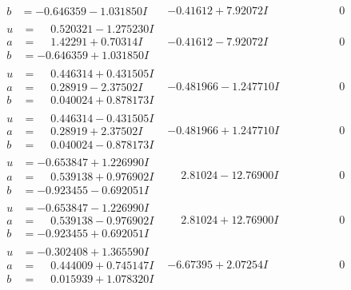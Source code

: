 \documentclass[1p]{elsarticle_modified}
\theoremstyle{definition}
\begin{document}
$$\begin{array}{c|c|c}
\begin{aligned}
b &= -0.646359 - 1.031850 I\end{aligned}
 & -0.41612 + 7.92072 I & \phantom{-0.000000 } 0 \\ \hline\begin{aligned}
u &= \phantom{-}0.520321 - 1.275230 I \\
a &= \phantom{-}1.42291 + 0.70314 I \\
b &= -0.646359 + 1.031850 I\end{aligned}
 & -0.41612 - 7.92072 I & \phantom{-0.000000 } 0 \\ \hline\begin{aligned}
u &= \phantom{-}0.446314 + 0.431505 I \\
a &= \phantom{-}0.28919 - 2.37502 I \\
b &= \phantom{-}0.040024 + 0.878173 I\end{aligned}
 & -0.481966 - 1.247710 I & \phantom{-0.000000 } 0 \\ \hline\begin{aligned}
u &= \phantom{-}0.446314 - 0.431505 I \\
a &= \phantom{-}0.28919 + 2.37502 I \\
b &= \phantom{-}0.040024 - 0.878173 I\end{aligned}
 & -0.481966 + 1.247710 I & \phantom{-0.000000 } 0 \\ \hline\begin{aligned}
u &= -0.653847 + 1.226990 I \\
a &= \phantom{-}0.539138 + 0.976902 I \\
b &= -0.923455 - 0.692051 I\end{aligned}
 & \phantom{-}2.81024 - 12.76900 I & \phantom{-0.000000 } 0 \\ \hline\begin{aligned}
u &= -0.653847 - 1.226990 I \\
a &= \phantom{-}0.539138 - 0.976902 I \\
b &= -0.923455 + 0.692051 I\end{aligned}
 & \phantom{-}2.81024 + 12.76900 I & \phantom{-0.000000 } 0 \\ \hline\begin{aligned}
u &= -0.302408 + 1.365590 I \\
a &= \phantom{-}0.444009 + 0.745147 I \\
b &= \phantom{-}0.015939 + 1.078320 I\end{aligned}
 & -6.67395 + 2.07254 I & \phantom{-0.000000 } 0 \\ \hline\begin{aligned}

\end{aligned}
\end{array}$$
\end{document}
